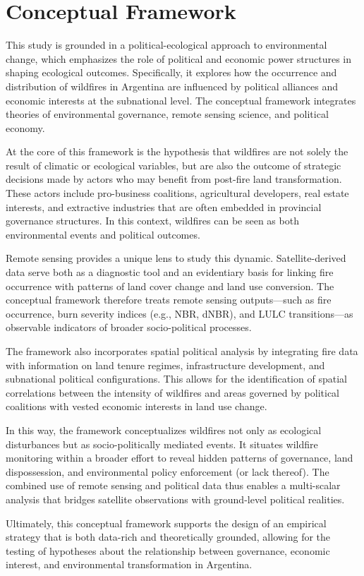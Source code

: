 \section{Conceptual Framework}

This study is grounded in a political-ecological approach to environmental change, which emphasizes the role of political and economic power structures in shaping ecological outcomes. Specifically, it explores how the occurrence and distribution of wildfires in Argentina are influenced by political alliances and economic interests at the subnational level. The conceptual framework integrates theories of environmental governance, remote sensing science, and political economy.

At the core of this framework is the hypothesis that wildfires are not solely the result of climatic or ecological variables, but are also the outcome of strategic decisions made by actors who may benefit from post-fire land transformation. These actors include pro-business coalitions, agricultural developers, real estate interests, and extractive industries that are often embedded in provincial governance structures. In this context, wildfires can be seen as both environmental events and political outcomes.

Remote sensing provides a unique lens to study this dynamic. Satellite-derived data serve both as a diagnostic tool and an evidentiary basis for linking fire occurrence with patterns of land cover change and land use conversion. The conceptual framework therefore treats remote sensing outputs—such as fire occurrence, burn severity indices (e.g., NBR, dNBR), and LULC transitions—as observable indicators of broader socio-political processes.

The framework also incorporates spatial political analysis by integrating fire data with information on land tenure regimes, infrastructure development, and subnational political configurations. This allows for the identification of spatial correlations between the intensity of wildfires and areas governed by political coalitions with vested economic interests in land use change.

In this way, the framework conceptualizes wildfires not only as ecological disturbances but as socio-politically mediated events. It situates wildfire monitoring within a broader effort to reveal hidden patterns of governance, land dispossession, and environmental policy enforcement (or lack thereof). The combined use of remote sensing and political data thus enables a multi-scalar analysis that bridges satellite observations with ground-level political realities.

Ultimately, this conceptual framework supports the design of an empirical strategy that is both data-rich and theoretically grounded, allowing for the testing of hypotheses about the relationship between governance, economic interest, and environmental transformation in Argentina.
